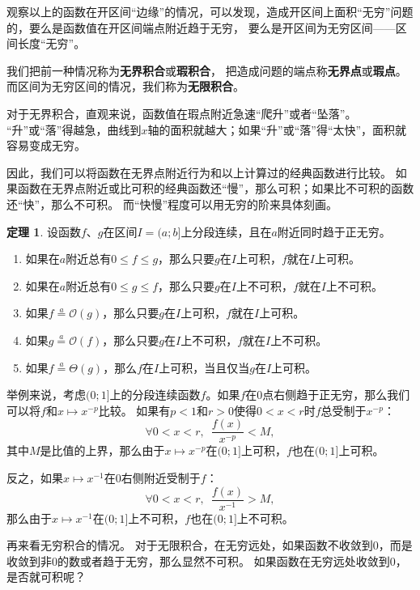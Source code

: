 \documentclass[12pt,UTF8]{ctexbook}
\newcommand{\oveq}[1]{\overset{#1}{=}}
\newcommand{\Olim}[1]{\mathcal{O}\left(#1\right)}  %
\newcommand{\Tlim}[1]{\mathcal{\Theta}\left(#1\right)}  %
\theoremstyle{definition}
\newtheorem{tm}{定理}[section]
\theoremstyle{plain}
\begin{document}
观察以上的函数在开区间“边缘”的情况，可以发现，造成开区间上面积“无穷”问题的，要么是函数值在开区间端点附近趋于无穷，
要么是开区间为无穷区间——区间长度“无穷”。

我们把前一种情况称为\textbf{无界积合}或\textbf{瑕积合}，
把造成问题的端点称\textbf{无界点}或\textbf{瑕点}。而区间为无穷区间的情况，我们称为\textbf{无限积合}。

对于无界积合，直观来说，函数值在瑕点附近急速“爬升”或者“坠落”。
“升”或“落”得越急，曲线到$x$轴的面积就越大；如果“升”或“落”得“太快”，面积就容易变成无穷。

因此，我们可以将函数在无界点附近行为和以上计算过的经典函数进行比较。
如果函数在无界点附近或比可积的经典函数还“慢”，那么可积；如果比不可积的函数还“快”，那么不可积。
而“快慢”程度可以用无穷的阶来具体刻画。

\begin{tm}
    设函数$f$、$g$在区间$I=(a;b]$上分段连续，且在$a$附近同时趋于正无穷。
    \begin{enumerate}
        \item 如果在$a$附近总有$0\leqslant f \leqslant g$，那么只要$g$在$I$上可积，$f$就在$I$上可积。
        \item 如果在$a$附近总有$0\leqslant g \leqslant f$，那么只要$g$在$I$上不可积，$f$就在$I$上不可积。
        \item 如果$f \oveq{a} \Olim{g}$，那么只要$g$在$I$上可积，$f$就在$I$上可积。
        \item 如果$g \oveq{a} \Olim{f}$，那么只要$g$在$I$上不可积，$f$就在$I$上不可积。
        \item 如果$f \oveq{a} \Tlim{g}$，那么$f$在$I$上可积，当且仅当$g$在$I$上可积。
    \end{enumerate}
\end{tm}

举例来说，考虑$(0;1]$上的分段连续函数$f$。如果$f$在$0$点右侧趋于正无穷，那么我们可以将$f$和$x\mapsto x^{-p}$比较。
如果有$p<1$和$r>0$使得$0<x<r$时$f$总受制于$x^{-p}$：
$$ \forall 0<x<r ,\,\,\,\frac{f(x)}{x^{-p}} < M,$$
其中$M$是比值的上界，那么由于$x\mapsto x^{-p}$在$(0;1]$上可积，$f$也在$(0;1]$上可积。

反之，如果$x\mapsto x^{-1}$在$0$右侧附近受制于$f$：
$$ \forall 0<x<r ,\,\,\,\frac{f(x)}{x^{-1}} > M,$$
那么由于$x\mapsto x^{-1}$在$(0;1]$上不可积，$f$也在$(0;1]$上不可积。

再来看无穷积合的情况。
对于无限积合，在无穷远处，如果函数不收敛到$0$，而是收敛到非$0$的数或者趋于无穷，那么显然不可积。
如果函数在无穷远处收敛到$0$，是否就可积呢？
\end{document}
